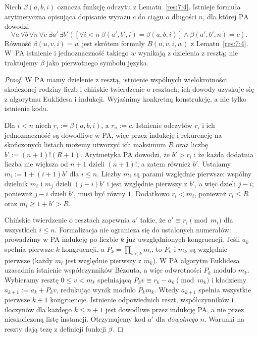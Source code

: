 \begin{lemat}
\label{lem:xi-append-beta}
Niech $\beta(a,b,i)$ oznacza funkcję odczytu z
Lematu~\ref{res:7:4}. Istnieje formuła arytmetyczna
opisująca dopisanie wyrazu $c$ do ciągu o długości $n$,
dla której $\mathrm{PA}$ dowodzi
\[
\forall a\,\forall b\,\forall n\,\forall c\;\exists a'\,\exists b'
\left(\left[\forall i<n\;\beta(a',b',i)=\beta(a,b,i)\right]
\land\beta(a',b',n)=c\right).
\]
Równość $\beta(u,v,i)=w$ jest skrótem formuły
$B(u,v,i,w)$ z Lematu~\ref{res:7:4}. W~PA istnienie i
jednoznaczność takiego $w$ wynikają z dzielenia z resztą;
nie traktujemy $\beta$ jako pierwotnego symbolu języka.
\end{lemat}
\begin{proof}
W $\mathrm{PA}$ mamy dzielenie z resztą, istnienie
wspólnych wielokrotności skończonej rodziny liczb i
chińskie twierdzenie o resztach; ich dowody uzyskuje się
z algorytmu Euklidesa i indukcji. Wyjaśnimy konkretną
konstrukcję, a nie tylko istnienie kodu.

Dla $i<n$ niech $r_i:=\beta(a,b,i)$, a $r_n:=c$.
Istnienie odczytów $r_i$ i ich jednoznaczność są dowodliwe
w PA, więc przez indukcję i rekurencję na skończonych listach
możemy utworzyć ich maksimum $R$ oraz liczbę
$b':=(n+1)!(R+1)$. Arytmetyka PA dowodzi, że $b'>r_i$
i że każda dodatnia liczba nie większa od $n+1$ dzieli
$(n+1)!$, a zatem również $b'$. Ustalamy
$m_i:=1+(i+1)b'$ dla $i\le n$. Liczby $m_i$ są parami
względnie pierwsze: wspólny dzielnik $m_i$ i $m_j$ dzieli
$(j-i)b'$ i jest względnie pierwszy z $b'$, a więc dzieli
$j-i$; ponieważ $j-i$ dzieli $b'$, musi być równy $1$.
Dodatkowo $r_i<m_i$, ponieważ $r_i\le R$ oraz
$m_i\ge 1+b'>R$.

Chińskie twierdzenie o resztach zapewnia $a'$ takie, że
$a'\equiv r_i\pmod {m_i}$ dla wszystkich $i\le n$.
Formalizacja nie ogranicza się do ustalonych numerałów:
prowadzimy w PA indukcję po liczbie $k$ już uwzględnionych
kongruencji. Jeśli $a_k$ spełnia pierwsze $k$ kongruencji,
a $P_k=\prod_{i<k}m_i$, to $P_k$ i $m_k$ są względnie
pierwsze (każdy $m_i$ jest względnie pierwszy z $m_k$).
W PA algorytm Euklidesa uzasadnia istnienie współczynników
Bézouta, a więc odwrotności $P_k$ modulo $m_k$.
Wybieramy resztę $0\le v<m_k$ spełniającą
$P_kv\equiv r_k-a_k\pmod{m_k}$ i kładziemy
$a_{k+1}:=a_k+P_kv$, redukując wynik modulo $P_km_k$.
Wtedy $a_{k+1}$ spełnia wszystkie pierwsze $k+1$
kongruencje. Istnienie odpowiednich reszt, współczynników
i iloczynów dla każdego $k\le n+1$ jest dowodliwe przez
indukcję PA, a nie przez nieskończoną listę instancji.
Otrzymujemy kod $a'$ dla \emph{dowolnego} $n$.
Warunki na reszty dają tezę z definicji funkcji $\beta$.
\end{proof}

